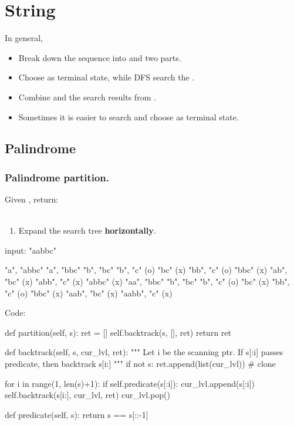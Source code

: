 \section{String}
In general, 
\begin{itemize}
\item Break down the sequence into  and  two parts. 
\item Choose  as terminal state, while DFS search the . 
\item Combine  and the search results from .
\item Sometimes it is easier to search  and choose  as terminal state. 
\end{itemize}
\subsection{Palindrome}
\subsubsection{Palindrome partition.} Given , return: \\
\pyinline{[["aa","b"], ["a","a","b"]]}
\\
\begin{enumerate}
\item Expand the search tree \textbf{horizontally}.
\end{enumerate}
\begin{python}
input: "aabbc"

"a", "abbc"
     "a", "bbc"
          "b", "bc"
               "b", "c" (o)
               "bc" (x)
          "bb", "c" (o)
          "bbc" (x)
     "ab", "bc" (x)
     "abb", "c" (x)
     "abbc" (x)
"aa", "bbc"
      "b", "bc"
           "b", "c" (o)
           "bc" (x)
      "bb", "c" (o)
      "bbc" (x)
"aab", "bc" (x)
"aabb", "c" (x)
\end{python}
Code:

\begin{python}
def partition(self, s):
    ret = []
    self.backtrack(s, [], ret)
    return ret

def backtrack(self, s, cur_lvl, ret):
    """
    Let i be the scanning ptr.
    If s[:i] passes predicate, then backtrack s[i:]
    """
    if not s:
        ret.append(list(cur_lvl))  # clone

    for i in range(1, len(s)+1):
        if self.predicate(s[:i]):
            cur_lvl.append(s[:i])
            self.backtrack(s[i:], cur_lvl, ret)
            cur_lvl.pop()

def predicate(self, s):
    return s == s[::-1]
\end{python}

